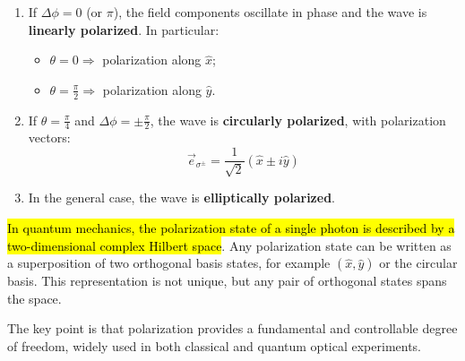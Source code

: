 \begin{enumerate}
    \item If $\Delta \phi = 0$ (or $\pi$), the field components oscillate in phase and the wave is \textbf{linearly polarized}. In particular:
    \begin{itemize}
        \item $\theta = 0 \Rightarrow$ polarization along $\hat{x}$;
        \item $\theta = \frac{\pi}{2} \Rightarrow$ polarization along $\hat{y}$.
    \end{itemize}
    
    \item If $\theta = \frac{\pi}{4}$ and $\Delta\phi = \pm \frac{\pi}{2}$, the wave is \textbf{circularly polarized}, with polarization vectors:
    \begin{equation}\label{eqn:2-circular-polarization}
        \vec{e}_{\sigma^{\pm}} = \frac{1}{\sqrt{2}}(\hat{x} \pm i \hat{y})
    \end{equation}
    
    \item In the general case, the wave is \textbf{elliptically polarized}.    
\end{enumerate}

\hl{In quantum mechanics, the polarization state of a single photon is described by a two-dimensional complex Hilbert space}. Any polarization state can be written as a superposition of two orthogonal basis states, for example $(\hat{x}, \hat{y})$ or the circular basis. This representation is not unique, but any pair of orthogonal states spans the space.

The key point is that polarization provides a fundamental and controllable degree of freedom, widely used in both classical and quantum optical experiments.